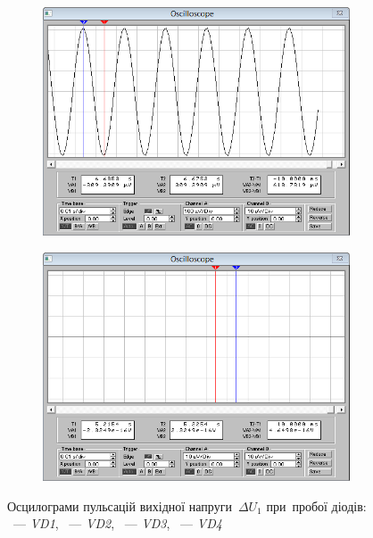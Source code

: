 \documentclass[
	a4paper,
	oneside,
	BCOR = 10mm,
	DIV = 12,
	12pt,
	headings = normal,
]{scrartcl}
\newcommand{\schel}[1]{\textit{#1}}
\begin{document}
\begin{figure}[!htbp]
\begin{subfigure}[t]{0.5\columnwidth}
					\caption{}
					\label{subfig:ewb-scope-02-02}
				\end{subfigure}
				\begin{subfigure}[t]{0.5\columnwidth}
					\centering
					\includegraphics[height = 8\baselineskip]{./assets/y03s02-pcdiag-lab-01-p02-03b.png}
					\caption{}
					\label{subfig:ewb-scope-02-03}
				\end{subfigure}%
				\begin{subfigure}[t]{0.5\columnwidth}
					\centering
					\includegraphics[height = 8\baselineskip]{./assets/y03s02-pcdiag-lab-01-p02-04b.png}
					\caption{}
					\label{subfig:ewb-scope-02-04}
				\end{subfigure}
				\caption{Осцилограми пульсацій вихідної напруги~$\Delta U_1$ при~пробої діодів: ~— \schel{VD1}, ~— \schel{VD2}, ~— \schel{VD3}, ~— \schel{VD4}}
				\label{fig:ewb-oscillograms-diod-shot}
			\end{figure}
\end{document}
